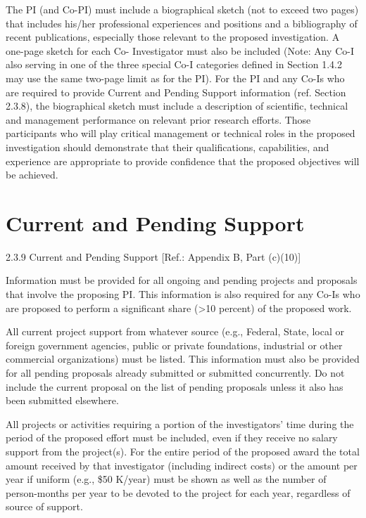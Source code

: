 \documentclass[12pt]{article}
\begin{document}
The PI (and Co-PI) must include a biographical sketch (not to exceed
two pages) that includes his/her professional experiences and
positions and a bibliography of recent publications, especially those
relevant to the proposed investigation. A one-page sketch for each Co-
Investigator must also be included (Note: Any Co-I also serving in one
of the three special Co-I categories defined in Section 1.4.2 may use
the same two-page limit as for the PI). For the PI and any Co-Is who
are required to provide Current and Pending Support information
(ref. Section 2.3.8), the biographical sketch must include a
description of scientific, technical and management performance on
relevant prior research efforts. Those participants who will play
critical management or technical roles in the proposed investigation
should demonstrate that their qualifications, capabilities, and
experience are appropriate to provide confidence that the proposed
objectives will be achieved.

\cleardoublepage




\cleardoublepage

\section*{Current and Pending Support}
2.3.9 Current and Pending Support [Ref.: Appendix B, Part (c)(10)]

Information must be provided for all ongoing and pending projects and
proposals that involve the proposing PI. This information is also
required for any Co-Is who are proposed to perform a significant share
(>10 percent) of the proposed work.

All current project support from whatever source (e.g., Federal,
State, local or foreign government agencies, public or private
foundations, industrial or other commercial organizations) must be
listed. This information must also be provided for all pending
proposals already submitted or submitted concurrently. Do not include
the current proposal on the list of pending proposals unless it also
has been submitted elsewhere.

All projects or activities requiring a portion of the investigators'
time during the period of the proposed effort must be included, even
if they receive no salary support from the project(s). For the entire
period of the proposed award the total amount received by that
investigator (including indirect costs) or the amount per year if
uniform (e.g., \$50 K/year) must be shown as well as the number of
person-months per year to be devoted to the project for each year,
regardless of source of support.
\end{document}
